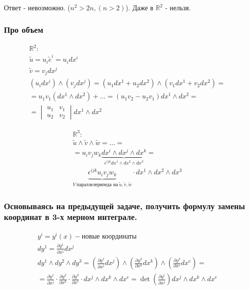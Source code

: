 Ответ - невозможно. (\(n^{2} > 2n, (n>2)\)). Даже в \(\mathbb{R}^{2}\) -
нельзя.

\subsubsection{Про
объем}

$$\begin{gather}
\mathbb{R}^{2}: \\
\tilde{u} = u_{i}\tilde{e}^{i} = u_{i} dx^{i} \\
\tilde{v} = v_{j}dx^{j} \\
(u_{i}dx^{i}) \wedge (v_{j}dx^{j}) = (u_{1}dx^{1} + u_{2}dx^{2}) \wedge (v_{1}dx^{1} + v_{2}dx^{2}) = \\
= u_{1}v_{1}(dx^{1}\wedge dx^{2}) + \dots = (u_{1}v_{2} - u_{2}v_{1})dx^{1}\wedge dx^{2} = \\
= \begin{vmatrix}
u_{1} & v_{1} \\
u_{2} & v_{2}
\end{vmatrix}dx^{1}\wedge dx^{2}
\end{gather}$$

$$\begin{gather}
\mathbb{R}^{3}: \\
\tilde{u}\wedge \tilde{v}\wedge \tilde{w} = \dots = \\
= u_{i}v_{j}w_{k}\underbrace{dx^{i} \wedge dx^{j} \wedge dx^{k}}_{\epsilon^{ijk}dx^{1} \wedge dx^{2} \wedge dx^{3}} = \\
\underbrace{\epsilon^{ijk}u_{i}v_{j}w_{k}}_{V \ \text{параллелерипеда на} \ \tilde{u}, \tilde{v}, \tilde{w}}\cdot dx^{1} \wedge dx^{2} \wedge dx^{3}
\end{gather}$$

\subsubsection{Основываясь на предыдущей задаче, получить формулу замены
координат в 3-х мерном
интеграле.}

$$\begin{gather}
y^{i} = y^{i}(x) - \text{новые координаты} \\
dy^{1} = \frac{\partial y^{1}}{\partial x^{j}}dx^{j} \\
dy^{1} \wedge dy^{2} \wedge dy^{3} = \left( \frac{\partial y^{1}}{\partial x^{j}}dx^{j} \right) \wedge\left( \frac{\partial y^{2}}{\partial x^{k}}dx^{k} \right)\wedge\left( \frac{\partial y^{2}}{\partial x^{e}}dx^{e} \right) = \\
= \frac{\partial y^{1}}{\partial x^{j}} \cdot \frac{\partial y^{2}}{\partial x^{k}} \cdot\frac{\partial y^{3}}{\partial x^{e}} \cdot dx^{j} \wedge dx^{k} \wedge dx^{e} = \det \left( \frac{\partial y^{i}}{\partial x^{j}} \right)dx^{j} \wedge dx^{k} \wedge dx^{e}
\end{gather}$$

